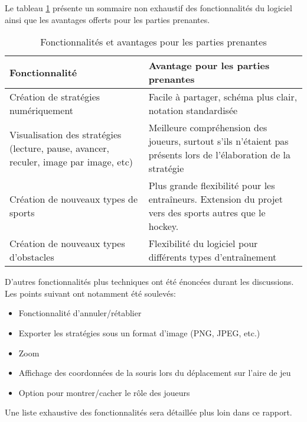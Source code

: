 Le tableau \ref{t:fonctionnalites} présente un sommaire non exhaustif des fonctionnalités du logiciel ainsi que les avantages offerts pour les parties prenantes.

\begin{table}
\caption{Fonctionnalités et avantages pour les parties prenantes}
\label{t:fonctionnalites}
\begin{tabular}{|p{6cm}|p{8cm}|}
	\hline
	\bfseries{Fonctionnalité}              & \bfseries{Avantage pour les parties prenantes} \\\hline
	Création de stratégies numériquement   & Facile à partager, schéma plus clair, notation standardisée \\\hline
	Visualisation des stratégies (lecture, pause, avancer, reculer, image par image, etc) & Meilleure compréhension des joueurs, surtout s'ils n'étaient pas présents lors de l'élaboration de la stratégie \\\hline
	Création de nouveaux types de sports   & Plus grande flexibilité pour les entraîneurs. Extension du projet vers des sports autres que le hockey. \\\hline
	Création de nouveaux types d'obstacles & Flexibilité du logiciel pour différents types d'entraînement \\
	\hline
\end{tabular}
\end{table}

D'autres fonctionnalités plus techniques ont été énoncées durant les discussions. Les points suivant ont notamment été soulevés:
\begin{itemize}
	\item Fonctionnalité d'annuler/rétablier
	\item Exporter les stratégies sous un format d'image (PNG, JPEG, etc.)
	\item Zoom
	\item Affichage des coordonnées de la souris lors du déplacement sur l'aire de jeu
	\item Option pour montrer/cacher le rôle des joueurs
\end{itemize}

Une liste exhaustive des fonctionnalités sera détaillée plus loin dans ce rapport.